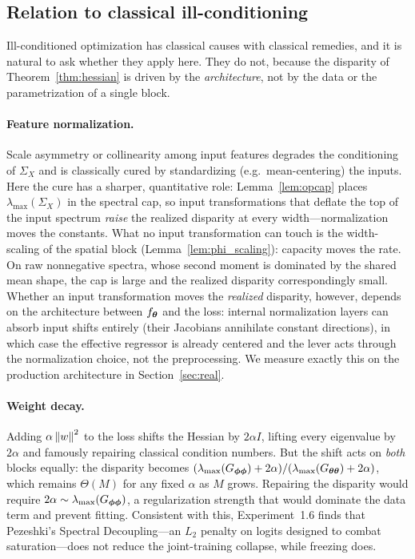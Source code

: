 \subsection{Relation to classical ill-conditioning}
\label{sec:classical_conditioning}

Ill-conditioned optimization has classical causes with classical
remedies, and it is natural to ask whether they apply here. They do
not, because the disparity of Theorem~\ref{thm:hessian} is driven by
the \emph{architecture}, not by the data or the parametrization of a
single block.

\paragraph{Feature normalization.}
Scale asymmetry or collinearity among input features degrades the
conditioning of $\Sigma_X$ and is classically cured by
standardizing (e.g.\ mean-centering) the inputs. Here the cure has
a sharper, quantitative role: Lemma~\ref{lem:opcap} places
$\lambda_{\max}(\Sigma_X)$ in the spectral cap, so input
transformations that deflate the top of the input spectrum
\emph{raise} the realized disparity at every width---normalization
moves the constants. What no input transformation can touch is the
width-scaling of the spatial block (Lemma~\ref{lem:phi_scaling}):
capacity moves the rate. On raw nonnegative spectra, whose second
moment is dominated by the shared mean shape, the cap is large and
the realized disparity correspondingly small. Whether an input
transformation moves the \emph{realized} disparity, however, depends
on the architecture between $f_{\boldsymbol{\theta}}$ and the loss: internal
normalization layers can absorb input shifts entirely (their
Jacobians annihilate constant directions), in which case the
effective regressor is already centered and the lever acts through
the normalization choice, not the preprocessing. We measure exactly
this on the production architecture in Section~\ref{sec:real}.

\paragraph{Weight decay.}
Adding $\alpha \left\lVert w\right\rVert^2$ to the loss shifts the Hessian by
$2\alpha I$, lifting every eigenvalue by $2\alpha$ and famously
repairing classical condition numbers. But the shift acts on
\emph{both} blocks equally: the disparity becomes
$(\lambda_{\max}(G_{{\boldsymbol{\phi}}{\boldsymbol{\phi}}}) + 2\alpha) /
(\lambda_{\max}(G_{{\boldsymbol{\theta}}{\boldsymbol{\theta}}}) + 2\alpha)$, which remains
$\Theta(M)$ for any fixed $\alpha$ as $M$ grows. Repairing the
disparity would require $2\alpha \sim \lambda_{\max}(G_{{\boldsymbol{\phi}}{\boldsymbol{\phi}}})$,
a regularization strength that would dominate the data term and
prevent fitting. Consistent with this, Experiment~1.6 finds that
Pezeshki's Spectral Decoupling---an $L_2$ penalty on logits designed
to combat saturation---does not reduce the joint-training collapse,
while freezing does.

